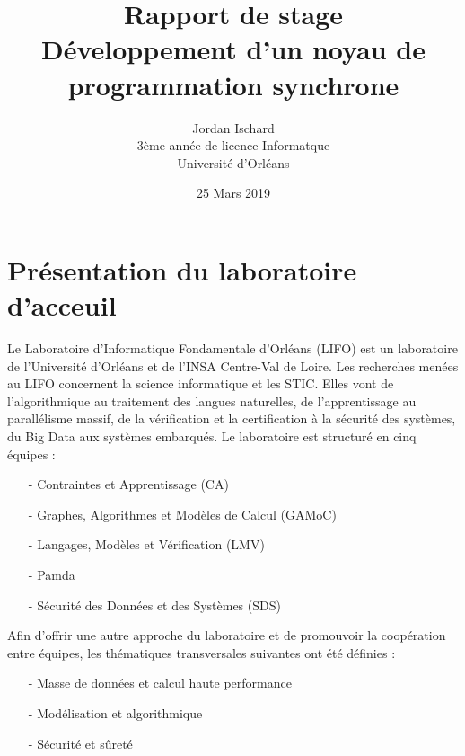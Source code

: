 \documentclass[10pt,a4paper]{report}
\begin{document}
		
\title{\textbf{Rapport de stage \\ Développement d'un noyau de programmation synchrone}}
\date{25 Mars 2019}
\author{Jordan Ischard\\3ème année de licence Informatque \\ Université d'Orléans}
\maketitle

\tableofcontents
\newpage

\section*{Présentation du laboratoire d'acceuil}
Le Laboratoire d'Informatique Fondamentale d'Orléans (LIFO) est un laboratoire de l'Université d'Orléans et de l'INSA Centre-Val de Loire. 
Les recherches menées au LIFO concernent la science informatique et les STIC. Elles vont de l'algorithmique au traitement des langues
naturelles, de l'apprentissage au parallélisme massif, de la vérification et la certification à la sécurité des systèmes, du Big Data aux
systèmes embarqués. Le laboratoire est structuré en cinq équipes :
\begin{enumerate}
\item[-] Contraintes et Apprentissage (CA)
\item[-] Graphes, Algorithmes et Modèles de Calcul (GAMoC)
\item[-] Langages, Modèles et Vérification (LMV)
\item[-] Pamda
\item[-] Sécurité des Données et des Systèmes (SDS)
\end{enumerate}
\medbreak

Afin d'offrir une autre approche du laboratoire et de promouvoir la coopération entre équipes, les thématiques transversales suivantes ont été définies :
\begin{enumerate}
\item[-] Masse de données et calcul haute performance
\item[-] Modélisation et algorithmique
\item[-] Sécurité et sûreté
\end{enumerate}
\medbreak
\end{document}
